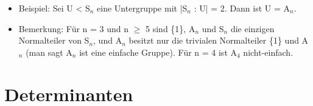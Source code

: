 \begin{itemize}
\item Beispiel: Sei U < S$_n$ eine Untergruppe mit |S$_n$ : U| = 2. Dann ist U = A$_n$.
\item Bemerkung: Für n = 3 und n $\ge$ 5 sind \{1\}, A$_n$ und S$_n$ die einzigen Normalteiler von S$_n$, und A$_n$ besitzt nur die trivialen Normalteiler \{1\} und A$_n$ (man sagt A$_n$ ist eine einfache Gruppe). Für n = 4 ist A$_4$ nicht-einfach.
\end{itemize}

\section{Determinanten}
